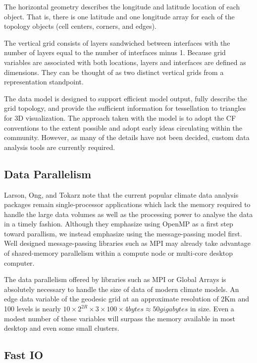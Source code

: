 The horizontal geometry describes the longitude and latitude location of each
object.  That is, there is one latitude and one longitude array for each of
the topology objects (cell centers, corners, and edges).

The vertical grid consists of layers sandwiched between interfaces with the
number of layers equal to the number of interfaces minus 1.   Because grid
variables are associated with both locations, layers and interfaces are
defined as dimensions.  They can be thought of as two distinct vertical grids
from a representation standpoint.

The data model is designed to support efficient model output, fully describe
the grid topology, and provide the sufficient information for tessellation to
triangles for 3D visualization.  The approach taken with the model is to adopt
the CF conventions to the extent possible and adopt early ideas circulating
within the community.  However, as many of the details have not been decided,
custom data analysis tools are currently required.

\subsection{Data Parallelism}

Larson, Ong, and Tokarz note that the current popular climate data analysis
packages remain single-processor applications which lack the memory required
to handle the large data volumes as well as the processing power to analyse
the data in a timely fashion.\cite{MODSIM07:LOT}  Although they emphasize
using OpenMP as a first step toward parallism, we instead emphasize using the
message-passing model first.  Well designed message-passing libraries such as
MPI may already take advantage of shared-memory parallelism within a compute
node or multi-core desktop computer.

The data parallelism offered by libraries such as MPI or Global Arrays is
absolutely necessary to handle the size of data of modern climate models.  An
edge data variable of the geodesic grid at an approximate resolution of 2Km
and 100 levels is nearly $10 \times 2^{2R} \times 3 \times 100 \times 4
\unit{bytes} \approx 50 \unit{gigabytes}$ in size.  Even a modest number of
these variables will surpass the memory available in most desktop and even
some small clusters.

\subsection{Fast IO}

